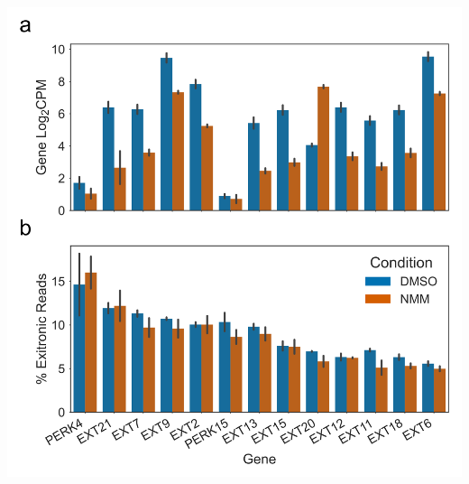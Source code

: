 \documentclass[12pt,a4paper,]{report}
\let\origfigure=\figure
\let\endorigfigure=\endfigure
\renewenvironment{figure}[1][2] {
    \expandafter\origfigure\expandafter[H]
} {
    \endorigfigure
}
\begin{document}
\newpage

\begin{figure}[htbp]
\centering
\includegraphics[width=\textwidth,height=562pt,keepaspectratio]{chapter_6/figures/extensin_percent_spliced.png}
\caption[NMM does not cause significant changes in the amount of Exitronic Splicing of Extensins]{\textbf{NMM   does   not   cause   significant   changes   in   the   amount   of   Exitronic   Splicing   of   Extensins}   Barplots   showing   \textbf{a)}   gene   expression   in   log2   counts   per   million,   and   \textbf{b)}   percentage   of   reads   exhibiting   Exitronic   splicing,   for   expressed   Extensin   genes   with   an   average   of   at   least   5\%   spliced   reads.   Levels   during   mock   (DMSO)   treatment   are   shown   in   blue,   and   levels   during   NMM   treatment   are   shown   in   orange.   Ordering   of   genes   (by   average   percent   spliced)   in   upper   and   lower   panels   is   matched.   Errorbars   are   standard   deviation   of   three   biological   replicates.   \label{perc_spliced}}
\end{figure}
\end{document}
